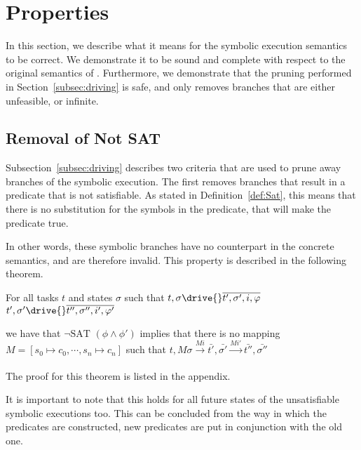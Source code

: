 


\section{Properties}
\label{sec:properties}

In this section, we describe what it means for the symbolic execution semantics to be correct.
We demonstrate it to be sound and complete with respect to the original semantics of \TOPHAT.
Furthermore, we demonstrate that the pruning performed in Section~\ref{subsec:driving} is safe,
and only removes branches that are either unfeasible, or infinite.

\subsection{Removal of Not SAT}

Subsection~\ref{subsec:driving} describes two criteria that are used to prune away branches of the symbolic execution.
The first removes branches that result in a predicate that is not satisfiable.
As stated in Definition~\ref{def:Sat}, this means that there is no substitution for the symbols in the predicate,
that will make the predicate true.

In other words, these symbolic branches have no counterpart in the concrete semantics, and are therefore invalid.
This property is described in the following theorem.

\begin{theorem}
  \label{thm:notSat}

For all tasks $t$ and states $\sigma$ such that
$t,\sigma\drive{}\overline{t',\sigma',i,\phi}$\quad
$t',\sigma'\drive{}\overline{t'',\sigma'',i',\phi'}$

we have that $\neg\text{SAT }(\phi\land\phi')$ implies
that there is no mapping $M=[s_0\mapsto c_0,\cdots,s_n\mapsto c_n]$ such that
$t,M\sigma\xrightarrow[]{Mi}\bar{t'},\bar{\sigma'}\xrightarrow[]{Mi'}\bar{t''},\bar{\sigma''}$

\end{theorem}

The proof for this theorem is listed in the appendix.

It is important to note that this holds for all future states of the unsatisfiable symbolic executions too.
This can be concluded from the way in which the predicates are constructed, new predicates are put in conjunction with the old one.

